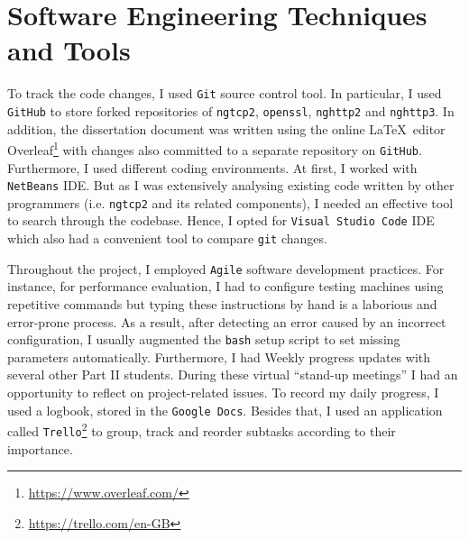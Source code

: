 \documentclass[12pt,a4paper]{report}
\begin{document}
\section{Software Engineering Techniques and Tools} \label{Software_Engineering_Techniques_and_Tools}
    To track the code changes, I used \texttt{Git} source control tool.
    In particular, I used \texttt{GitHub} to store forked repositories of \texttt{ngtcp2}, \texttt{openssl}, \texttt{nghttp2} and \texttt{nghttp3}.
    In addition, the dissertation document was written using the online \LaTeX\  editor Overleaf\footnote{\url{https://www.overleaf.com/}} with changes also committed to a separate repository on \texttt{GitHub}.
    Furthermore, I used different coding environments.
    At first, I worked with \texttt{NetBeans} IDE.
    But as I was extensively analysing existing code written by other programmers (i.e. \texttt{ngtcp2} and its related components), I needed an effective tool to search through the codebase.
    Hence, I opted for \texttt{Visual Studio Code} IDE which also had a convenient tool to compare \texttt{git} changes.
    
    
    Throughout the project, I employed \texttt{Agile} software development practices.
    For instance, for performance evaluation, I had to configure testing machines using repetitive commands but typing these instructions by hand is a laborious and error-prone process.
    As a result, after detecting an error caused by an incorrect configuration, I usually augmented the \texttt{bash} setup script to set missing parameters automatically.
    Furthermore, I had Weekly progress updates with several other Part II students.
    During these virtual \enquote{stand-up meetings} I had an opportunity to reflect on project-related issues.
    To record my daily progress, I used a logbook, stored in the \texttt{Google Docs}.
    Besides that, I used an application called \texttt{Trello}\footnote{\url{https://trello.com/en-GB}} to group, track and reorder subtasks according to their importance.

    
\end{document}
